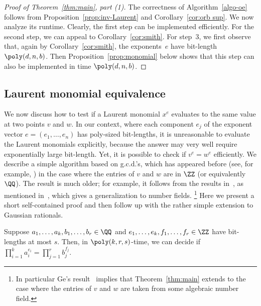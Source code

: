 \begin{proof} [Proof of Theorem~\ref{thm:main}, part (1)]
The correctness of Algorithm~\ref{algo-oe} follows from Proposition~\ref{prop:inv-Laurent} and Corollary~\ref{cor:orb sup}.
We now analyze its runtime.
Clearly, the first step can be implemented efficiently.
For the second step, we can appeal to Corollary~\ref{cor:smith}.
For step~3, we first observe that, again by Corollary~\ref{cor:smith}, the exponents~$e$ have bit-length $\poly(d,n,b)$.
Then Proposition~\ref{prop:monomial} below shows that this step can also be implemented in time $\poly(d,n,b)$.
\end{proof}

%
%

%
\subsection{Laurent monomial equivalence}\label{subsec:moneq}
%
We now discuss how to test if a Laurent monomial $x^e$ evaluates to the same value at two points $v$ and $w$.
In our context, where each component $e_j$ of the exponent vector $e = (e_1,\dots,e_n)$ has poly-sized bit-lengths, it is unreasonable to evaluate the Laurent monomials explicitly, because the answer may very well require exponentially large bit-length.
Yet, it is possible to check if $v^e = w^e$ efficiently.
We describe a simple algorithm based on g.c.d.'s, which has appeared before (see, for example, \cite{ESY14}) in the case where the entries of $v$ and $w$ are in $\ZZ$ (or equivalently $\QQ$).
The result is much older; for example, it follows from the results in~\cite{BDS}, as mentioned in~\cite{Ge93}, which gives a generalization to number fields.
\footnote{In particular Ge's result~\cite{Ge93} implies that Theorem~\ref{thm:main} extends to the case where the entries of $v$ and $w$ are taken from some algebraic number field.}
Here we present a short self-contained proof and then follow up with the rather simple extension to Gaussian rationals.

\begin{lemma}
Suppose $a_1,\dots,a_k,b_1,\dots,b_r \in\QQ$ and $e_1,\dots,e_k, f_1,\dots,f_r \in \ZZ$ have bit-lengths at most $s$.
Then, in $\poly(k,r,s)$-time, we can decide if $\prod_{i=1}^k a_i^{e_i} = \prod_{j=1}^r b_j^{f_j}$.
\end{lemma}

